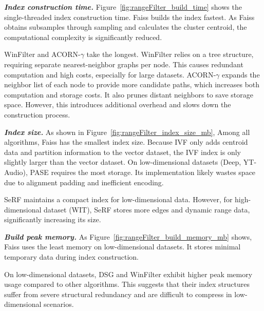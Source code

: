 \documentclass[sigconf, nonacm]{acmart}
\begin{document}
	\textit{\textbf{Index construction time.}}
	Figure~\ref{fig:rangeFilter_build_time} shows the single-threaded index construction time. Faiss builds the index fastest. As Faiss obtains subsamples through sampling and calculates the cluster centroid, the computational complexity is significantly reduced.
	
	
	WinFilter and ACORN-\(\gamma\) take the longest.
	WinFilter relies on a tree structure, requiring separate nearest-neighbor graphs per node. This causes redundant computation and high costs, especially for large datasets.
	ACORN-\(\gamma\) expands the neighbor list of each node to provide more candidate paths, which increases both computation and storage costs. It also prunes distant neighbors to save storage space. However, this introduces additional overhead and slows down the construction process.
	
	\textit{\textbf{Index size.}} 
	As shown in Figure~\ref{fig:rangeFilter_index_size_mb}, Among all algorithms, Faiss has the smallest index size. Because IVF only adds centroid data and partition information to the vector dataset, the IVF index is only slightly larger than the vector dataset.
	On low-dimensional datasets (Deep, YT-Audio), PASE requires the most storage. Its implementation likely wastes space due to alignment padding and inefficient encoding. %
	
	SeRF maintains a compact index for low-dimensional data. However, for high-dimensional dataset (WIT), SeRF stores more edges and dynamic range data, significantly increasing its size.
	
	\textit{\textbf{Build peak memory.}}
	As Figure~\ref{fig:rangeFilter_build_memory_mb} shows, Faiss uses the least memory on low-dimensional datasets. It stores minimal temporary data during index construction.
	
	On low-dimensional datasets, DSG and WinFilter exhibit higher peak memory usage compared to other algorithms. This suggests that their index structures suffer from severe structural redundancy and are difficult to compress in low-dimensional scenarios.
	
	
	
\end{document}
